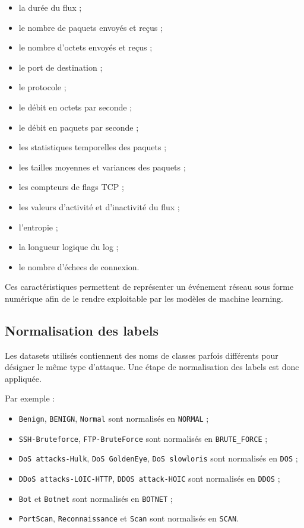 \documentclass[12pt,a4paper,oneside]{report}
\begin{document}
	\begin{itemize}
		\item la durée du flux ;
		\item le nombre de paquets envoyés et reçus ;
		\item le nombre d'octets envoyés et reçus ;
		\item le port de destination ;
		\item le protocole ;
		\item le débit en octets par seconde ;
		\item le débit en paquets par seconde ;
		\item les statistiques temporelles des paquets ;
		\item les tailles moyennes et variances des paquets ;
		\item les compteurs de flags TCP ;
		\item les valeurs d'activité et d'inactivité du flux ;
		\item l'entropie ;
		\item la longueur logique du log ;
		\item le nombre d'échecs de connexion.
	\end{itemize}
	
	Ces caractéristiques permettent de représenter un événement réseau sous forme numérique afin de le rendre exploitable par les modèles de machine learning.
	
	\subsection{Normalisation des labels}
	
	Les datasets utilisés contiennent des noms de classes parfois différents pour désigner le même type d'attaque. Une étape de normalisation des labels est donc appliquée.
	
	Par exemple :
	
	\begin{itemize}
		\item \texttt{Benign}, \texttt{BENIGN}, \texttt{Normal} sont normalisés en \texttt{NORMAL} ;
		\item \texttt{SSH-Bruteforce}, \texttt{FTP-BruteForce} sont normalisés en \texttt{BRUTE\_FORCE} ;
		\item \texttt{DoS attacks-Hulk}, \texttt{DoS GoldenEye}, \texttt{DoS slowloris} sont normalisés en \texttt{DOS} ;
		\item \texttt{DDoS attacks-LOIC-HTTP}, \texttt{DDOS attack-HOIC} sont normalisés en \texttt{DDOS} ;
		\item \texttt{Bot} et \texttt{Botnet} sont normalisés en \texttt{BOTNET} ;
		\item \texttt{PortScan}, \texttt{Reconnaissance} et \texttt{Scan} sont normalisés en \texttt{SCAN}.
	\end{itemize}
	
\end{document}
